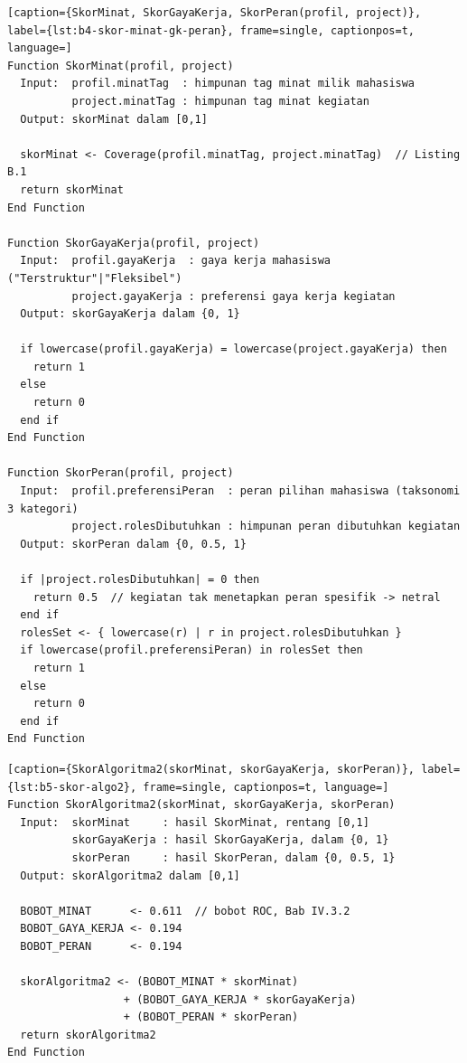 \begin{minipage}{\textwidth}
\begin{lstlisting}[caption={SkorMinat, SkorGayaKerja, SkorPeran(profil, project)}, label={lst:b4-skor-minat-gk-peran}, frame=single, captionpos=t, language=]
Function SkorMinat(profil, project)
  Input:  profil.minatTag  : himpunan tag minat milik mahasiswa
          project.minatTag : himpunan tag minat kegiatan
  Output: skorMinat dalam [0,1]

  skorMinat <- Coverage(profil.minatTag, project.minatTag)  // Listing B.1
  return skorMinat
End Function

Function SkorGayaKerja(profil, project)
  Input:  profil.gayaKerja  : gaya kerja mahasiswa ("Terstruktur"|"Fleksibel")
          project.gayaKerja : preferensi gaya kerja kegiatan
  Output: skorGayaKerja dalam {0, 1}

  if lowercase(profil.gayaKerja) = lowercase(project.gayaKerja) then
    return 1
  else
    return 0
  end if
End Function

Function SkorPeran(profil, project)
  Input:  profil.preferensiPeran  : peran pilihan mahasiswa (taksonomi 3 kategori)
          project.rolesDibutuhkan : himpunan peran dibutuhkan kegiatan
  Output: skorPeran dalam {0, 0.5, 1}

  if |project.rolesDibutuhkan| = 0 then
    return 0.5  // kegiatan tak menetapkan peran spesifik -> netral
  end if
  rolesSet <- { lowercase(r) | r in project.rolesDibutuhkan }
  if lowercase(profil.preferensiPeran) in rolesSet then
    return 1
  else
    return 0
  end if
End Function
\end{lstlisting}
\end{minipage}

\begin{minipage}{\textwidth}
\begin{lstlisting}[caption={SkorAlgoritma2(skorMinat, skorGayaKerja, skorPeran)}, label={lst:b5-skor-algo2}, frame=single, captionpos=t, language=]
Function SkorAlgoritma2(skorMinat, skorGayaKerja, skorPeran)
  Input:  skorMinat     : hasil SkorMinat, rentang [0,1]
          skorGayaKerja : hasil SkorGayaKerja, dalam {0, 1}
          skorPeran     : hasil SkorPeran, dalam {0, 0.5, 1}
  Output: skorAlgoritma2 dalam [0,1]

  BOBOT_MINAT      <- 0.611  // bobot ROC, Bab IV.3.2
  BOBOT_GAYA_KERJA <- 0.194
  BOBOT_PERAN      <- 0.194

  skorAlgoritma2 <- (BOBOT_MINAT * skorMinat)
                  + (BOBOT_GAYA_KERJA * skorGayaKerja)
                  + (BOBOT_PERAN * skorPeran)
  return skorAlgoritma2
End Function
\end{lstlisting}
\end{minipage}

